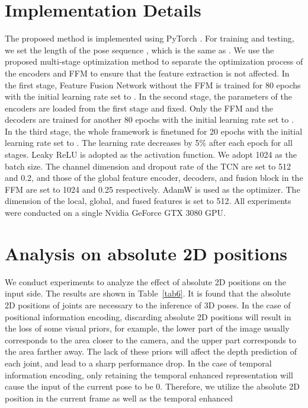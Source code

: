 \documentclass[sigconf]{acmart}
\begin{document}
\begin{multicols}{2}
\section{Implementation Details}\label{implement}
The proposed method is implemented using PyTorch . For training and testing, we set the length of the pose sequence , which is the same as . We use the proposed multi-stage optimization method to separate the optimization process of the encoders and FFM to ensure that the feature extraction is not affected. In the first stage, Feature Fusion Network without the FFM is trained for 80 epochs with the initial learning rate set to . In the second stage, the parameters of the encoders are loaded from the first stage and fixed. Only the FFM and the decoders are trained for another 80 epochs with the initial learning rate set to . In the third stage, the whole framework is finetuned for 20 epochs with the initial learning rate set to . The learning rate decreases by 5\% after each epoch for all stages. Leaky ReLU  is adopted as the activation function. We adopt 1024 as the batch size. The channel dimension and dropout rate of the TCN are set to 512 and 0.2, and those of the global feature encoder, decoders, and fusion block in the FFM are set to 1024 and 0.25 respectively. AdamW  is used as the optimizer. The dimension of the local, global, and fused features is set to 512. All experiments were conducted on a single Nvidia GeForce GTX 3080 GPU.

\section{Analysis on absolute 2D positions}
We conduct experiments to analyze the effect of absolute 2D positions on the input side. The results are shown in Table~\ref{tab6}. It is found that the absolute 2D positions of joints are necessary to the inference of 3D poses. In the case of positional information encoding, discarding absolute 2D positions will result in the loss of some visual priors, for example, the lower part of the image usually corresponds to the area closer to the camera, and the upper part corresponds to the area farther away. The lack of these priors will affect the depth prediction of each joint, and lead to a sharp performance drop. In the case of temporal information encoding, only retaining the temporal enhanced representation will cause the input of the current pose to be 0. Therefore, we utilize the absolute 2D position in the current frame as well as the temporal enhanced



\end{multicols}
\end{document}
